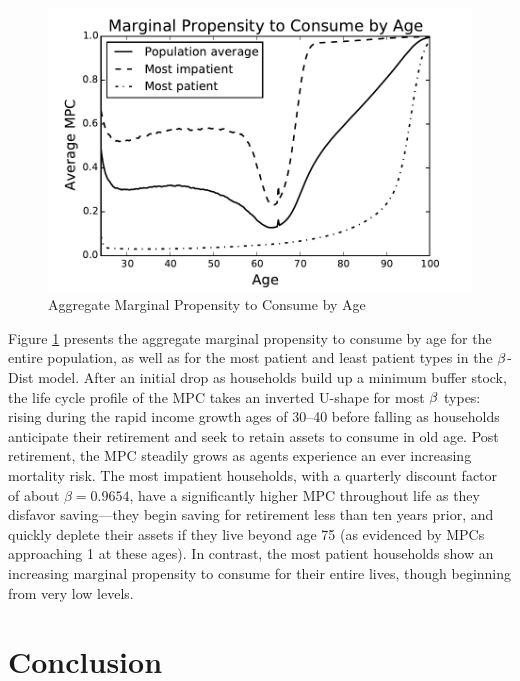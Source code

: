 \documentclass[12pt,titlepage]{econtex}
\begin{document}
\begin{figure}
  \caption{Aggregate Marginal Propensity to Consume by Age}
  \label{fig:MPCbyAge}
  \begin{center}
    \includegraphics{./Figures/MPCbyAge}
  \end{center}
\end{figure}

Figure \ref{fig:MPCbyAge} presents the aggregate marginal propensity to consume by age for the entire population, as well as for the most patient and least patient types in the $\beta$-Dist model.  After an initial drop as households build up a minimum buffer stock, the life cycle profile of the MPC takes an inverted U-shape for most $\beta$ types: rising during the rapid income growth ages of 30--40 before falling as households anticipate their retirement and seek to retain assets to consume in old age.  Post retirement, the MPC steadily grows as agents experience an ever increasing mortality risk.  The most impatient households, with a quarterly discount factor of about $\beta = 0.9654$, have a significantly higher MPC throughout life as they disfavor saving---they begin saving for retirement less than ten years prior, and quickly deplete their assets if they live beyond age 75 (as evidenced by MPCs approaching 1 at these ages).  In contrast, the most patient households show an increasing marginal propensity to consume for their entire lives, though beginning from very low levels.

\section{Conclusion}\label{sec:Conclusion}
\end{document}
